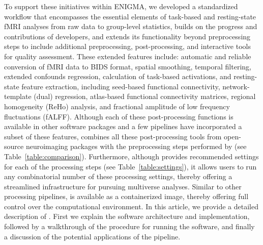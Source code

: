 To support these initiatives within ENIGMA, we developed a standardized
workflow that encompasses the essential elements of task-based and
resting-state fMRI analyses from raw data to group-level statistics, builds
on the progress and contributions of  developers, and
extends its functionality beyond preprocessing steps to include additional
preprocessing, post-processing, and interactive tools for quality
assessment. These extended features include: automatic and reliable
conversion of fMRI data to BIDS format, spatial smoothing, temporal
filtering, extended confounds regression, calculation of task-based
activations, and resting-state feature extraction, including seed-based
functional connectivity, network-template (dual) regression, atlas-based
functional connectivity matrices, regional homogeneity (ReHo) analysis, and
fractional amplitude of low frequency fluctuations (fALFF). Although each
of these post-processing functions is available in other software packages
and a few pipelines have incorporated a subset of these features,
 combines all these post-processing tools from open-source
neuroimaging packages with the preprocessing steps performed by
 (see Table~\ref{table:comparison}). Furthermore, although
 provides recommended settings for each of the processing
steps (see Table~\ref{table:settings}), it allows users to run any combinatorial
number of these processing settings, thereby offering a streamlined
infrastructure for pursuing multiverse analyses. Similar to other
processing pipelines,  is available as a containerized
image, thereby offering full control over the computational environment.
In this article, we provide a detailed description of . 
First we explain the software architecture and implementation, followed by
a walkthrough of the procedure for running the software, and finally a 
discussion of the potential applications of the pipeline.


